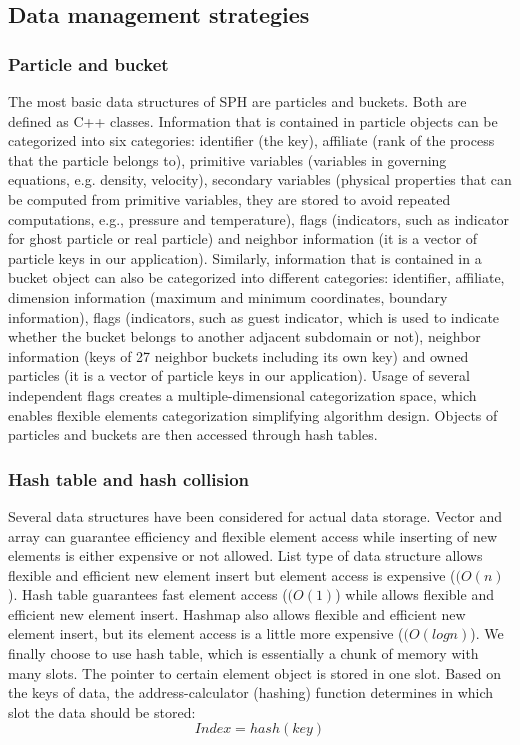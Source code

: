 \subsection{Data management strategies}
\subsubsection{Particle and bucket}
The most basic data structures of SPH are particles and buckets. Both are defined as C++ classes. Information that is contained in particle objects can be categorized into six categories: identifier (the key), affiliate (rank of the process that the particle belongs to), primitive variables (variables in governing equations, e.g. density, velocity), secondary variables (physical properties that can be computed from primitive variables, they are stored to avoid repeated computations, e.g., pressure and temperature), flags (indicators, such as indicator for ghost particle or real particle) and neighbor information (it is a vector of particle keys in our application). Similarly, information that is contained in a bucket object can also be categorized into different categories: identifier, affiliate, dimension information (maximum and minimum coordinates, boundary information), flags (indicators, such as guest indicator, which is used to indicate whether the bucket belongs to another adjacent subdomain or not), neighbor information (keys of 27 neighbor buckets including its own key) and owned particles (it is a vector of particle keys in our application).
Usage of several independent flags creates a multiple-dimensional categorization space, which enables flexible elements categorization simplifying algorithm design.
Objects of particles and buckets are then accessed through hash tables.

\subsubsection{Hash table and hash collision}
Several data structures have been considered for actual data storage. Vector and array can guarantee efficiency and flexible element access while inserting of new elements is either expensive or not allowed. List type of data structure allows flexible and efficient new element insert but element access is expensive ($(O(n)$).
Hash table guarantees fast element access ($(O(1)$) while allows flexible and efficient new element insert. Hashmap also allows flexible and efficient new element insert, but its element access is a little more expensive ($(O(logn)$). We finally choose to use hash table, which is essentially a chunk of memory with many slots. The pointer to certain element object is stored in one slot. Based on the keys of data, the address-calculator (hashing) function determines in which slot the data should be stored:
\begin{equation}
Index = hash(key)
\end{equation}

